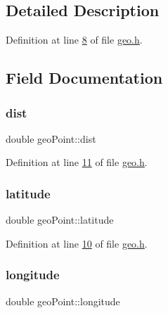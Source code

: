 \subsection{Detailed Description}


Definition at line \hyperlink{geo_8h_source_l00008}{8} of file \hyperlink{geo_8h_source}{geo.\+h}.



\subsection{Field Documentation}
\mbox{\label{structgeoPoint_a7541ba7a36b28e2df80349061c8feee2}} 
\subsubsection{\texorpdfstring{dist}{dist}}
{\footnotesize\ttfamily double geo\+Point\+::dist}



Definition at line \hyperlink{geo_8h_source_l00011}{11} of file \hyperlink{geo_8h_source}{geo.\+h}.

\mbox{\label{structgeoPoint_a623f43a5345083ecbd20e10ef1c4abd9}} 
\subsubsection{\texorpdfstring{latitude}{latitude}}
{\footnotesize\ttfamily double geo\+Point\+::latitude}



Definition at line \hyperlink{geo_8h_source_l00010}{10} of file \hyperlink{geo_8h_source}{geo.\+h}.

\mbox{\label{structgeoPoint_ac74494d18d8bcec6059914faa006489b}} 
\subsubsection{\texorpdfstring{longitude}{longitude}}
{\footnotesize\ttfamily double geo\+Point\+::longitude}



